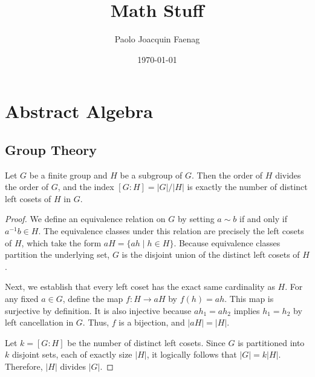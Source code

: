 \documentclass[11pt]{scrartcl}
\begin{document}
\title{Math Stuff}
\author{Paolo Joacquin Faenag}
\date{\today}
\maketitle
\tableofcontents

\section{Abstract Algebra}

\subsection{Group Theory}

\begin{theorem}
    Let $G$ be a finite group and $H$ be a subgroup of $G$. Then the order of $H$ divides the order of $G$, and the index $[G:H] = |G|/|H|$ is exactly the number of distinct left cosets of $H$ in $G$.
\end{theorem}
\begin{proof}
    We define an equivalence relation on $G$ by setting $a \sim b$ if and only if $a^{-1}b \in H$. The equivalence classes under this relation are precisely the left cosets of $H$, which take the form $aH = \{ah \mid h \in H\}$. Because equivalence classes partition the underlying set, $G$ is the disjoint union of the distinct left cosets of $H$.
    
    Next, we establish that every left coset has the exact same cardinality as $H$. For any fixed $a \in G$, define the map $f \colon H \to aH$ by $f(h) = ah$. This map is surjective by definition. It is also injective because $ah_1 = ah_2$ implies $h_1 = h_2$ by left cancellation in $G$. Thus, $f$ is a bijection, and $|aH| = |H|$.
    
    Let $k = [G:H]$ be the number of distinct left cosets. Since $G$ is partitioned into $k$ disjoint sets, each of exactly size $|H|$, it logically follows that $|G| = k|H|$. Therefore, $|H|$ divides $|G|$.
\end{proof}
\end{document}
